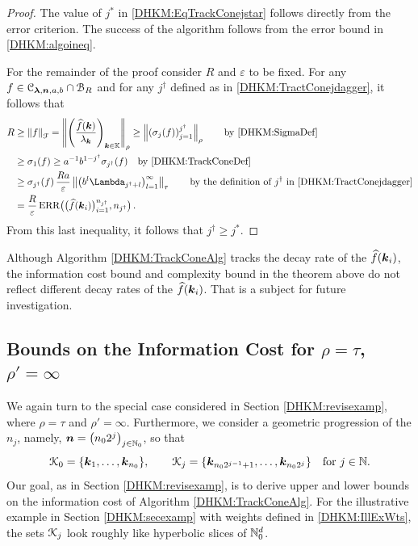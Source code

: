 \documentclass[USenglish]{article}
\theoremstyle{dgthm}
\theoremstyle{dgthm}
\theoremstyle{dgthm}
\theoremstyle{dgthm}
\theoremstyle{dgdef}
\theoremstyle{definition}
\DeclareMathOperator{\DHKMERR}{ERR}
\newcommand{\DHKMdataNjd}{\bigl(\DHKMhf(\bsk_i)\bigr)_{i=1}^{n_{j^\dagger}}}
\newcommand{\DHKMERRNjd}{\DHKMERR\bigl(\DHKMdataNjd,n_{j^\dagger}\bigr)}
\newcommand{\DHKMhf}{\widehat{f}}
\newcommand{\DHKMnorm}[2][{}]{\ensuremath{\left \lVert #2 \right \rVert}_{#1}}
\begin{document}
\begin{proof}
The value of $j^*$ in \eqref{DHKM:EqTrackConejstar} follows directly from the error criterion. The success of the algorithm follows from the error bound in \eqref{DHKM:algoineq}.

For the remainder of the proof consider $R$ and $\varepsilon$ to be fixed.  For any $f \in  {\mathcal{C}}_{\boldsymbol{\lambda},{\boldsymbol{n}},a,b} \cap {\mathcal{B}}_R$ and for any $j^\dagger$ defined  as in \eqref{DHKM:TractConejdagger}, it follows that
\begin{align*}
R &\ge \DHKMnorm[\calF]{f} = \DHKMnorm[\rho]{\left(\frac{\DHKMhf(\bsk)}{\lambda_{\bsk}} \right)_{\bsk \in \bbK}}
 \ge \DHKMnorm[\rho]{\left(\sigma_j(f)\right)_{j=1}^{j^\dagger}}  
 \qquad \text{by \eqref{DHKM:SigmaDef} } \\
& \ge \sigma_1(f) \ge a^{-1}b^{1-j^\dagger}\sigma_{j^\dagger}(f) \quad \text{by  \eqref{DHKM:TrackConeDef}}\\
& \ge \sigma_{j^\dagger}(f)\,\frac{Ra}{\varepsilon} \DHKMnorm[\tau]{ \bigl(b^l \Lambda_{j^\dagger+l} \bigr)_{l=1}^\infty}
\qquad \text{by the definition of } j^\dagger \text{ in \eqref{DHKM:TractConejdagger}} \\
& = \frac{R}{\varepsilon} \DHKMERRNjd\, .
\end{align*}
From this last inequality, it follows that $j^\dagger \ge j^*$.
\end{proof} 

Although Algorithm \ref{DHKM:TrackConeAlg} tracks the decay rate of the $\DHKMhf(\bsk_i)$, the information cost bound and complexity bound in the theorem above do not reflect different decay rates of the $\DHKMhf(\bsk_i)$. That is a subject for future investigation.  

\subsection{Bounds on the Information Cost for $\rho = \tau$, $\rho' = \infty$}\label{DHKM:SecDecayRhoEqTau}
We again turn to the special case considered in Section \ref{DHKM:revisexamp}, where $\rho = \tau$ and $\rho' = \infty$.  Furthermore, we consider a geometric progression of the $n_j$, namely, ${\boldsymbol{n}} = \bigl (n_02^j \bigr)_{j \in {\mathbb{N}}_0}$, so that
\[
{\mathcal{K}}_0 = \{{\boldsymbol{k}}_{1}, \ldots, {\boldsymbol{k}}_{n_0}\}, \qquad {\mathcal{K}}_j = \{{\boldsymbol{k}}_{n_0 2^{j-1}+1}, \ldots, {\boldsymbol{k}}_{n_02^j}\} \quad \text{for } j \in {\mathbb{N}}.
\]
Our goal, as in Section \ref{DHKM:revisexamp}, is to derive upper and lower bounds on the information cost of Algorithm \ref{DHKM:TrackConeAlg}. For the illustrative example in Section \ref{DHKM:secexamp} with weights defined in \eqref{DHKM:IllExWts}, the sets ${\mathcal{K}}_j$ look roughly like hyperbolic slices of ${\mathbb{N}}_0^d$.
\end{document}
